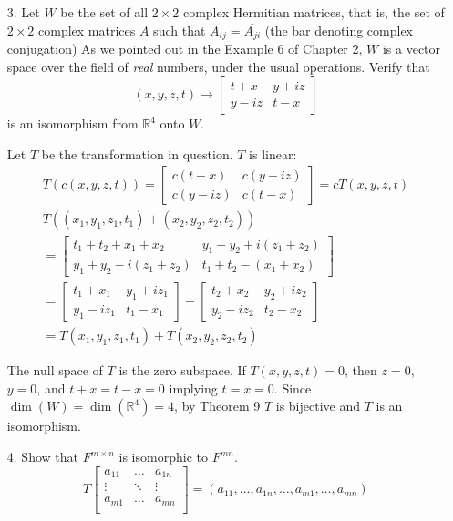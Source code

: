 \documentclass{article}
\begin{document}
\begin{enumerate}[listparindent=\parindent]
\begin{enumerate}[listparindent=\parindent]
    \end{enumerate}

\item[3.] Let \(W\) be the set of all \(2 \times 2\) complex Hermitian matrices, that is,
    the set of \(2 \times 2\) complex matrices \(A\) such that \(A_{ij} = \overline{A_{ji}}\) (the bar denoting complex conjugation)
    As we pointed out in the Example 6 of Chapter 2, \(W\) is a vector space over the field of \textit{real} numbers, under the usual operations.
    Verify that
    \[ (x, y, z, t) \rightarrow \begin{bmatrix} t + x & y + iz \\ y - iz & t - x \end{bmatrix} \]
    is an isomorphism from \(\mathbb{R}^4\) onto \(W\).

    Let \(T\) be the transformation in question. \(T\) is linear:
    \begin{gather*}
        T(c(x, y, z, t)) = \begin{bmatrix} c(t + x) & c(y + iz) \\ c(y - iz) & c(t - x) \end{bmatrix} = cT(x, y, z, t) \\
        T((x_1, y_1, z_1, t_1) + (x_2, y_2, z_2, t_2)) \\
        = \begin{bmatrix} t_1 + t_2 + x_1 + x_2 & y_1 + y_2 + i(z_1 + z_2) \\ y_1 + y_2 - i(z_1 + z_2) & t_1 + t_2 - (x_1 + x_2) \end{bmatrix} \\
        = \begin{bmatrix} t_1 + x_1 & y_1 + iz_1 \\ y_1 - iz_1 & t_1 - x_1 \end{bmatrix} + \begin{bmatrix} t_2 + x_2 & y_2 + iz_2 \\ y_2 - iz_2 & t_2 - x_2 \end{bmatrix} \\
        = T(x_1, y_1, z_1, t_1) + T(x_2, y_2, z_2, t_2)
    \end{gather*}

    The null space of \(T\) is the zero subspace. If \(T(x, y, z, t) = 0\), then \(z = 0\), \(y = 0\), and \(t + x = t - x = 0\) implying \(t = x = 0\).
    Since \(\dim(W) = \dim(\mathbb{R}^4) = 4\), by Theorem 9 \(T\) is bijective and \(T\) is an isomorphism.

\item[4.] Show that \(F^{m \times n}\) is isomorphic to \(F^{mn}\).
    \[
        T\begin{bmatrix}
            a_{11} & \dots & a_{1n} \\
            \vdots & \ddots & \vdots \\
            a_{m1} & \dots & a_{mn} \\
        \end{bmatrix}
        =
        (a_{11}, \dots, a_{1n}, \dots, a_{m1}, \dots, a_{mn})
    \]


\end{enumerate}
\end{document}
